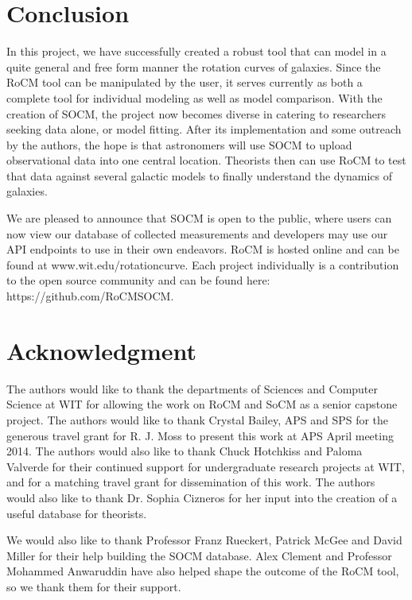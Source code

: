 \documentclass[conference]{IEEEtran-modified}
\begin{document}
\newpage

\section{Conclusion}
In this project, we have successfully created a robust tool that can model in a quite general and free form manner the rotation curves of galaxies.  Since the RoCM tool can be manipulated by the user, it serves currently as both a complete tool for individual modeling as well as model comparison.  With the creation of SOCM, the project now becomes diverse in catering to researchers seeking data alone, or model fitting.  After its implementation and some outreach by the authors, the hope is that astronomers will use SOCM to upload observational data into one central location. Theorists then can use RoCM to test that data against several galactic models to finally understand the dynamics of galaxies. 

	 We are pleased to announce that SOCM is open to the public, where users can now view our database of collected measurements and developers may use our API endpoints to use in their own endeavors. RoCM is hosted online and can be found at www.wit.edu/rotationcurve. Each project individually is a contribution to the open source community and can be found here: https://github.com/RoCMSOCM.



\section*{Acknowledgment}

The authors would like to thank the departments of Sciences and Computer Science at WIT for allowing the work on RoCM and SoCM as a senior capstone project. The authors would like to thank Crystal Bailey, APS and SPS for the generous travel grant for R. J. Moss to present this work at APS April meeting 2014. The authors would also like to thank Chuck Hotchkiss and Paloma Valverde for their continued support for undergraduate research projects at WIT, and for a matching travel grant for dissemination of this work. The authors would also like to thank Dr. Sophia Cizneros for her input into the creation of a useful database for theorists.

We would also like to thank Professor Franz Rueckert, Patrick McGee and David Miller for their help building the SOCM database. Alex Clement and Professor Mohammed Anwaruddin have also helped shape the outcome of the RoCM tool, so we thank them for their support.
\end{document}

